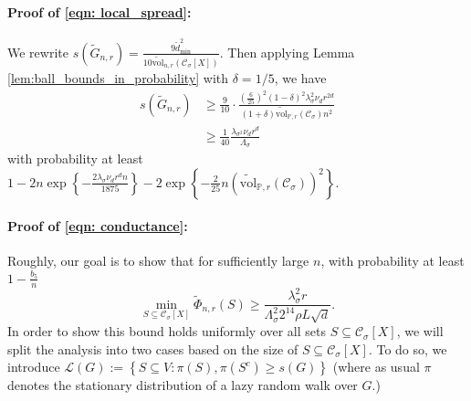 \documentclass[11pt,twoside]{article}
\newcommand{\set}[1]{\left\{#1\right\}}
\newcommand{\vol}{\mathrm{vol}}
\newcommand{\1}{\mathbbm{1}}
\newcommand{\Xbf}{X}
\newcommand{\Pbb}{\mathbb{P}}
\newcommand{\Cset}{\mathcal{C}}
\newcommand{\Csig}{\Cset_{\sigma}}
\newcommand{\degminwt}{\widetilde{d}_{\min}}
\begin{document}
\paragraph{Proof of \eqref{eqn: local_spread}:}

We rewrite $s(\widetilde{G}_{n,r}) = \frac{9 \degminwt^2}{10\widetilde{\vol}_{n,r}(\Csig[\Xbf])}$. Then applying Lemma \ref{lem:ball_bounds_in_probability} with $\delta = 1/5$, we have
\begin{align*}
s(\widetilde{G}_{n,r}) & \geq \frac{9}{10} \cdot \frac{\left(\frac{6}{25}\right)^2 (1 - \delta)^2 \lambda_{\sigma}^2 \nu_d r^{2d}}{(1 + \delta)\widetilde{\vol}_{\Pbb,r}(\Csig)n^2} \\
& \geq \frac{1}{40} \frac{\lambda_{\sigma^2} \nu_d r^{d}}{\Lambda_{\sigma}}
\end{align*}
with probability at least $1 - 2n\exp\set{-\frac{2\lambda_{\sigma} \nu_d r^d n}{1875}} - 2\exp\set{-\frac{2}{25}n(\widetilde{\vol}_{\Pbb,r}(\Csig))^2}$. 

\paragraph{Proof of \eqref{eqn: conductance}:}

Roughly, our goal is to show that for sufficiently large $n$, with probability at least $1 - \frac{b_5}{n}$
\begin{equation*}
\min_{S \subseteq \Csig[\Xbf]} \widetilde{\Phi}_{n,r}(S) \geq \frac{\lambda_{\sigma}^2 r}{\Lambda_{\sigma}^2 2^{14} \rho L \sqrt{d}}.
\end{equation*}
In order to show this bound holds uniformly over all sets $S \subseteq \Csig[\Xbf]$, we will split the analysis into two cases based on the size of $S \subseteq \Csig[\Xbf]$. To do so, we introduce $\mathcal{L}(G) := \set{S \subseteq V: \pi(S), \pi(S^c) \geq s(G)}$ (where as usual $\pi$ denotes the stationary distribution of a lazy random walk over $G$.)
\end{document}

